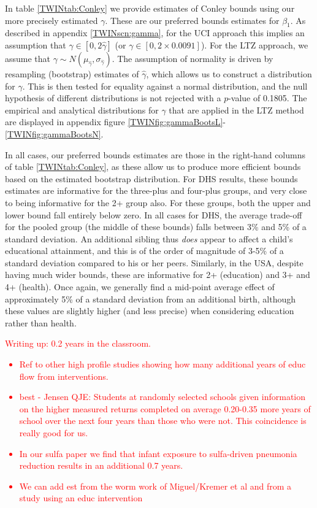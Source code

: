 \documentclass[subeqn]{article}
\begin{document}
\begin{spacing}{1.4}
In table \ref{TWINtab:Conley} we provide estimates of Conley bounds using 
our more precisely estimated $\gamma$.  These are our preferred bounds 
estimates for $\beta_1$.  As described in appendix \ref{TWINscn:gamma}, for 
the UCI approach this implies an assumption that $\gamma \in [0,2\hat\gamma]$
(or $\gamma \in [0,2\times 0.0091]$).  For the LTZ approach, we assume that 
$\gamma\sim N(\mu_{\hat\gamma},\sigma_{\hat\gamma})$.  The assumption of 
normality is driven by resampling (bootstrap) estimates of $\hat\gamma$,
which allows us to construct a distribution for $\gamma$.  This is then
tested for equality against a normal distribution, and the null hypothesis
of different distributions is not rejected with a $p$-value of 0.1805.  The 
empirical and analytical distributions for $\gamma$ that are applied in the 
LTZ method are displayed in appendix figure \ref{TWINfig:gammaBootsL}-%
\ref{TWINfig:gammaBootsN}.

In all cases, our preferred bounds estimates are those in the right-hand
columns of table \ref{TWINtab:Conley}, as these allow us to produce more
efficient bounds based on the estimated bootstrap distribution.  For DHS
results, these bounds estimates are informative for the three-plus and 
four-plus groups, and very close to being informative for the 2+ group also.  
For these groups, both the upper and lower bound fall entirely below zero. In
all cases for DHS, the average trade-off for the pooled group (the middle of
these bounds) falls between 3\% and 5\% of a standard deviation.  An additional
sibling thus \emph{does} appear to affect a child's educational attainment,
and this is of the order of magnitude of 3-5\% of a standard deviation compared
to his or her peers.  Similarly, in the USA, despite having much wider bounds,
these are informative for 2+ (education) and 3+ and 4+ (health).  Once again,
we generally find a mid-point average effect of approximately 5\% of a 
standard deviation from an additional birth, although these values are slightly
higher (and less precise) when considering education rather than health.
 
\textcolor{red}{ Writing up: 0.2 years in the classroom.
\begin{itemize}
\item Ref to other high profile studies showing how many additional years of 
educ flow from interventions.
\item  best - Jensen QJE: Students at randomly selected schools given 
information on the higher measured returns completed on average 0.20-0.35 more 
years of school over the next four years than those who were not. This 
coincidence is really good for us.
\item In our sulfa paper we find that infant exposure to sulfa-driven pneumonia 
reduction results in an additional 0.7 years.
\item We can add est from the worm work of Miguel/Kremer et al and from a study 
using an educ intervention
\end{itemize}
}


\end{spacing}
\end{document}
